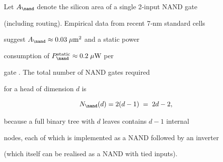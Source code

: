 \label{subsec:area-power}













Let \(A_{\nand}\) denote the silicon area of a single 2‑input NAND gate






(including routing).  Empirical data from recent 7‑nm standard cells






suggest \(A_{\nand}\approx 0.03\;\mu\text{m}^2\) and a static power






consumption of \(P_{\nand}^{\text{static}}\approx 0.2\;\mu\text{W}\) per






gate \cite{kumar2020softmax}.  The total number of NAND gates required






for a head of dimension \(d\) is













\[






N_{\nand}(d)=2(d-1) \;=\; 2d-2,






\]






because a full binary tree with \(d\) leaves contains \(d-1\) internal






nodes, each of which is implemented as a NAND followed by an inverter






(which itself can be realised as a NAND with tied inputs).













